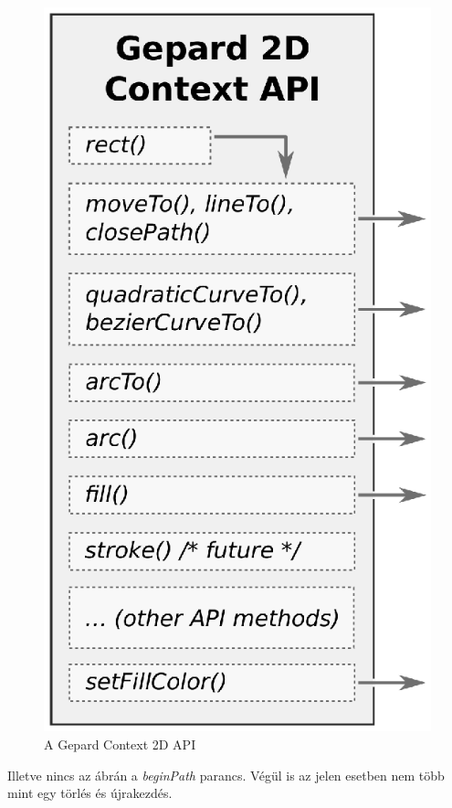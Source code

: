\documentclass[12pt]{report}
\theoremstyle{definition}
\begin{document}
    \begin{figure}
    \begin{center}
      \includegraphics[scale=0.6]{img/dataflow_canvas_api_eps}
    \end{center}
      \caption{\label{dataflow-canvas-API-diagram}
      A Gepard Context 2D API}
    \end{figure}
Illetve nincs az ábrán a \emph{beginPath} parancs. Végül is az
jelen esetben nem több mint egy törlés és újrakezdés.
\end{document}
